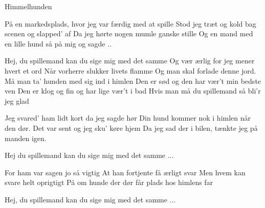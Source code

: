 \begin{sang}{Himmelhunden}{}
\begin{vers}
På en markedsplads, hvor jeg var færdig med at spille
Stod jeg træt og kold bag scenen og slapped' af
Da jeg hørte nogen mumle ganske stille
Og en mand med en lille hund så på mig og sagde ..
\end{vers}
\begin{vers}
Hej, du spillemand kan du sige mig med det samme
Og vær ærlig for jeg mener hvert et ord
Når vorherre slukker livets flamme
Og man skal forlade denne jord.
Må man ta' hunden med sig ind i himlen
Den er sød og den har vær't min bedste ven
Den er klog og fin og har lige vær't i bad
Hvis man må du spillemand så bli'r jeg glad
\end{vers}
\begin{vers}
Jeg svared' ham lidt kort da jeg sagde hør
Din hund kommer nok i himlen når den dør.
Det var sent og jeg sku' køre hjem
Da jeg sad der i bilen, tænkte jeg på manden igen.
\end{vers}
\begin{vers}
Hej du spillemand kan du sige mig med det samme ...
\end{vers}
\begin{vers}
For ham var sagen jo så vigtig
At han fortjente få ærligt svar 
Men hvem kan svare helt oprigtigt
På om hunde der dør får plads hos himlens far
\end{vers}
\begin{vers}
Hej, du spillemand kan du sige mig med det samme ...
\end{vers}
\end{sang}